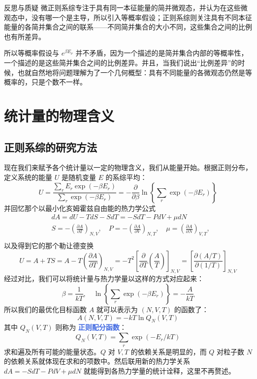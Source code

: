 \documentclass[hyperref,UTF-8]{ctexbook}
\newcommand{\0}{\boldsymbol{0}}
\begin{document}
\begin{justification}{\kaishu 反思与质疑}
\kaishu \fontsize{11pt}{16pt}
    \quad\quad 微正则系综专注于具有同一本征能量的简并微观态，并认为在这些微观态中，没有哪一个是主导，所以引入等概率假设；正则系综则关注具有不同本征能量的各简并集合之间的联系——不同简并集合的大小不同，这些集合之间的比例也有所差异。

    \quad\quad 所以等概率假设与 $e^{\beta E_\nu}$ 并不矛盾，因为一个描述的是简并集合内部的等概率性，一个描述的是这些简并集合之间的比例差异。并且，当我们说出“比例差异”的时候，也就自然地将问题理解为了一个几何概型：具有不同能量的各微观态仍然是等概率的，只是个数不一样。
\end{justification}

\section{统计量的物理含义}\label{sec:统计量的物理含义}

\subsection{正则系综的研究方法}
现在我们来赋予各个统计量以一定的物理含义，我们从能量开始。根据正则分布，定义系统的能量 $U$ 是随机变量 $E$ 的系综平均：
\begin{equation}
    U=\frac{\sum_r E_r \exp \left(-\beta E_r\right)}{\sum_r \exp \left(-\beta E_r\right)}=-\frac{\partial}{\partial \beta} \ln \left\{\sum_r \exp \left(-\beta E_r\right)\right\}
\end{equation}
并回忆那个以最小化亥姆霍兹自由能的热力学公式
\[
    \begin{aligned}
& d A=d U-T d S-S d T=-S d T-P d V+\mu d N \\
& S=-\left(\frac{\partial A}{\partial T}\right)_{N, V}, \quad P=-\left(\frac{\partial A}{\partial V}\right)_{N, T}, \quad \mu=\left(\frac{\partial A}{\partial N}\right)_{V, T}, \\
&
\end{aligned}
\]
以及得到它的那个勒让德变换
\[
    U=A+T S=A-T\left(\frac{\partial A}{\partial T}\right)_{N, V}=-T^2\left[\frac{\partial}{\partial T}\left(\frac{A}{T}\right)\right]_{N, V}=\left[\frac{\partial(A / T)}{\partial(1 / T)}\right]_{N, V}
\]
经过对比，我们可以将统计量与热力学量以这样的方式对应起来：
\begin{equation}
    \beta=\frac{1}{k T}, \quad \ln \left\{\sum_r \exp \left(-\beta E_r\right)\right\}=-\frac{A}{k T}
\end{equation}
所以我们的最优化目标函数 $A$ 就可以表示为 $(N,V,T)$ 的函数了：
\begin{equation}
        A(N, V, T)=-k T \ln Q_N(V, T)
\end{equation}
其中 $Q_N(V,T)$ 则称为 \textcolor{RoyalBlue}{\textbf{\kaishu 正则配分函数}}：
\begin{equation}
    Q_N(V, T)=\sum_r \exp \left(-E_r / k T\right)
\end{equation}
求和遍及所有可能的能量状态。$Q$ 对 $V,T$ 的依赖关系是明显的，而 $Q$ 对粒子数 $N$ 的依赖关系就体现在求和的项数中。然后联用新的热力学关系 $d A= -S d T-P d V+\mu d N $ 就能得到各热力学量的统计诠释，这里不再赘述。
\end{document}
